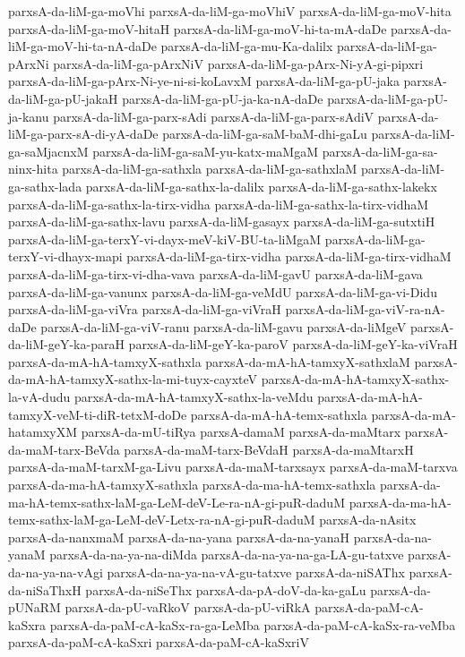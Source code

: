 {parxsA-da-liM-ga-moVhi
parxsA-da-liM-ga-moVhiV
parxsA-da-liM-ga-moV-hita
parxsA-da-liM-ga-moV-hitaH
parxsA-da-liM-ga-moV-hi-ta-mA-daDe
parxsA-da-liM-ga-moV-hi-ta-nA-daDe
parxsA-da-liM-ga-mu-Ka-dalilx
parxsA-da-liM-ga-pArxNi
parxsA-da-liM-ga-pArxNiV
parxsA-da-liM-ga-pArx-Ni-yA-gi-pipxri
parxsA-da-liM-ga-pArx-Ni-ye-ni-si-koLavxM
parxsA-da-liM-ga-pU-jaka
parxsA-da-liM-ga-pU-jakaH
parxsA-da-liM-ga-pU-ja-ka-nA-daDe
parxsA-da-liM-ga-pU-ja-kanu
parxsA-da-liM-ga-parx-sAdi
parxsA-da-liM-ga-parx-sAdiV
parxsA-da-liM-ga-parx-sA-di-yA-daDe
parxsA-da-liM-ga-saM-baM-dhi-gaLu
parxsA-da-liM-ga-saMjacnxM
parxsA-da-liM-ga-saM-yu-katx-maMgaM
parxsA-da-liM-ga-sa-ninx-hita
parxsA-da-liM-ga-sathxla
parxsA-da-liM-ga-sathxlaM
parxsA-da-liM-ga-sathx-lada
parxsA-da-liM-ga-sathx-la-dalilx
parxsA-da-liM-ga-sathx-lakekx
parxsA-da-liM-ga-sathx-la-tirx-vidha
parxsA-da-liM-ga-sathx-la-tirx-vidhaM
parxsA-da-liM-ga-sathx-lavu
parxsA-da-liM-gasayx
parxsA-da-liM-ga-sutxtiH
parxsA-da-liM-ga-terxY-vi-dayx-meV-kiV-BU-ta-liMgaM
parxsA-da-liM-ga-terxY-vi-dhayx-mapi
parxsA-da-liM-ga-tirx-vidha
parxsA-da-liM-ga-tirx-vidhaM
parxsA-da-liM-ga-tirx-vi-dha-vava
parxsA-da-liM-gavU
parxsA-da-liM-gava
parxsA-da-liM-ga-vanunx
parxsA-da-liM-ga-veMdU
parxsA-da-liM-ga-vi-Didu
parxsA-da-liM-ga-viVra
parxsA-da-liM-ga-viVraH
parxsA-da-liM-ga-viV-ra-nA-daDe
parxsA-da-liM-ga-viV-ranu
parxsA-da-liM-gavu
parxsA-da-liMgeV
parxsA-da-liM-geY-ka-paraH
parxsA-da-liM-geY-ka-paroV
parxsA-da-liM-geY-ka-viVraH
parxsA-da-mA-hA-tamxyX-sathxla
parxsA-da-mA-hA-tamxyX-sathxlaM
parxsA-da-mA-hA-tamxyX-sathx-la-mi-tuyx-cayxteV
parxsA-da-mA-hA-tamxyX-sathx-la-vA-dudu
parxsA-da-mA-hA-tamxyX-sathx-la-veMdu
parxsA-da-mA-hA-tamxyX-veM-ti-diR-tetxM-doDe
parxsA-da-mA-hA-temx-sathxla
parxsA-da-mA-hatamxyXM
parxsA-da-mU-tiRya
parxsA-damaM
parxsA-da-maMtarx
parxsA-da-maM-tarx-BeVda
parxsA-da-maM-tarx-BeVdaH
parxsA-da-maMtarxH
parxsA-da-maM-tarxM-ga-Livu
parxsA-da-maM-tarxsayx
parxsA-da-maM-tarxva
parxsA-da-ma-hA-tamxyX-sathxla
parxsA-da-ma-hA-temx-sathxla
parxsA-da-ma-hA-temx-sathx-laM-ga-LeM-deV-Le-ra-nA-gi-puR-daduM
parxsA-da-ma-hA-temx-sathx-laM-ga-LeM-deV-Letx-ra-nA-gi-puR-daduM
parxsA-da-nAsitx
parxsA-da-nanxmaM
parxsA-da-na-yana
parxsA-da-na-yanaH
parxsA-da-na-yanaM
parxsA-da-na-ya-na-diMda
parxsA-da-na-ya-na-ga-LA-gu-tatxve
parxsA-da-na-ya-na-vAgi
parxsA-da-na-ya-na-vA-gu-tatxve
parxsA-da-niSAThx
parxsA-da-niSaThxH
parxsA-da-niSeThx
parxsA-da-pA-doV-da-ka-gaLu
parxsA-da-pUNaRM
parxsA-da-pU-vaRkoV
parxsA-da-pU-viRkA
parxsA-da-paM-cA-kaSxra
parxsA-da-paM-cA-kaSx-ra-ga-LeMba
parxsA-da-paM-cA-kaSx-ra-veMba
parxsA-da-paM-cA-kaSxri
parxsA-da-paM-cA-kaSxriV
}
